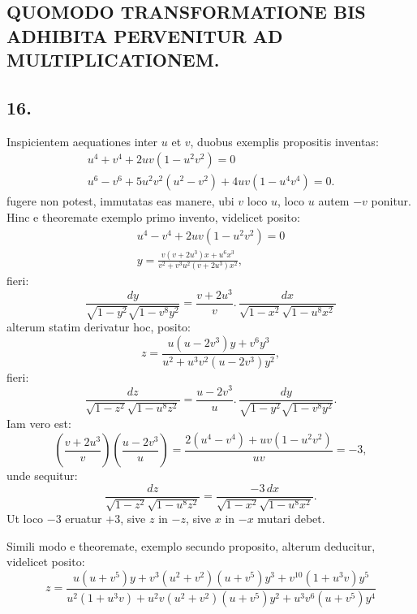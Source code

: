 \documentclass{article}
\begin{document}

\subsection*{QUOMODO TRANSFORMATIONE BIS ADHIBITA PERVENITUR AD MULTIPLICATIONEM.}

\subsection*{16.}

Inspicientem aequationes inter $u$ et $v$, duobus exemplis propositis inventas:
\[
\begin{gathered}
u^{4}+v^{4}+2uv(1-u^{2}v^{2})=0\\
u^{6}-v^{6}+5u^{2}v^{2}(u^{2}-v^{2})+4uv(1-u^{4}v^{4})=0.
\end{gathered}
\]
fugere non potest, immutatas eas manere, ubi $v$ loco $u$, loco $u$ autem $-v$ ponitur. Hinc e theoremate exemplo primo invento, videlicet posito:
\[
\begin{gathered}
u^{4}-v^{4}+2uv(1-u^{2}v^{2})=0\\
y=\frac{v(v+2u^{3})x+u^{6}x^{3}}{v^{2}+v^{3}u^{2}(v+2u^{3})x^{2}},
\end{gathered}
\]
fieri:
\[
\frac{dy}{\sqrt{1-y^{2}}\sqrt{1-v^{8}y^{2}}}=\frac{v+2u^{3}}{v}.\,\frac{dx}{\sqrt{1-x^{2}}\sqrt{1-u^{8}x^{2}}}
\]
alterum statim derivatur hoc, posito:
\[
z=\frac{u(u-2v^{3})y+v^{6}y^{3}}{u^{2}+u^{3}v^{2}(u-2v^{3})y^{2}},
\]
fieri:
\[
\frac{dz}{\sqrt{1-z^{2}}\sqrt{1-u^{8}z^{2}}}=\frac{u-2v^{3}}{u}.\,\frac{dy}{\sqrt{1-y^{2}}\sqrt{1-v^{8}y^{2}}}.
\]
Iam vero est:
\[
\left(\frac{v+2u^{3}}{v}\right)\left(\frac{u-2v^{3}}{u}\right)=\frac{2(u^{4}-v^{4})+uv(1-u^{2}v^{2})}{uv}=-3,
\]
unde sequitur:
\[
\frac{dz}{\sqrt{1-z^{2}}\sqrt{1-u^{8}z^{2}}}=\frac{-3\,dx}{\sqrt{1-x^{2}}\sqrt{1-u^{8}x^{2}}}.
\]
Ut loco $-3$ eruatur $+3$, sive $z$ in $-z$, sive $x$ in $-x$ mutari debet.

Simili modo e theoremate, exemplo secundo proposito, alterum deducitur, videlicet posito:
\[
z=\frac{u(u+v^{5})y+v^{3}(u^{2}+v^{2})(u+v^{5})y^{3}+v^{10}(1+u^{3}v)y^{5}}{u^{2}(1+u^{3}v)+u^{2}v(u^{2}+v^{2})(u+v^{5})y^{2}+u^{3}v^{6}(u+v^{5})y^{4}}
\]
\end{document}
